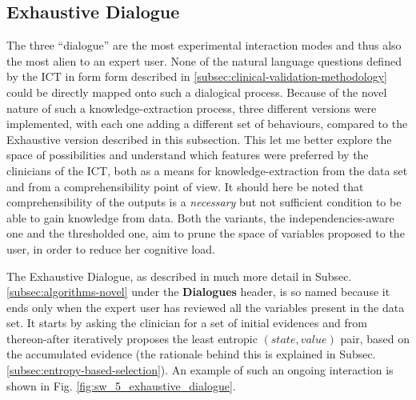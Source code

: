 \subsection{Exhaustive Dialogue}
The three \enquote{dialogue} are the most experimental interaction modes and thus also the most alien to an expert user.
None of the natural language questions defined by the ICT in form form described in \ref{subsec:clinical-validation-methodology} could be directly mapped onto such a dialogical process.
Because of the novel nature of such a knowledge-extraction process, three different versions were implemented, with each one adding a different set of behaviours, compared to the Exhaustive version described in this subsection.
This let me better explore the space of possibilities and understand which features were preferred by the clinicians of the ICT, both as a means for knowledge-extraction from the data set and from a comprehensibility point of view.
It should here be noted that comprehensibility of the outputs is a \textit{necessary} but not sufficient condition to be able to gain knowledge from data.
Both the variants, the independencies-aware one and the thresholded one, aim to prune the space of variables proposed to the user, in order to reduce her cognitive load.

The Exhaustive Dialogue, as described in much more detail in Subsec. \ref{subsec:algorithms-novel} under the \textbf{Dialogues} header, is so named because it ends only when the expert user has reviewed all the variables present in the data set.
It starts by asking the clinician for a set of initial evidences and from thereon-after iteratively proposes the least entropic $(state,value)$ pair, based on the accumulated evidence (the rationale behind this is explained in Subsec. \ref{subsec:entropy-based-selection}).
An example of such an ongoing interaction is shown in Fig. \ref{fig:sw_5_exhaustive_dialogue}.

